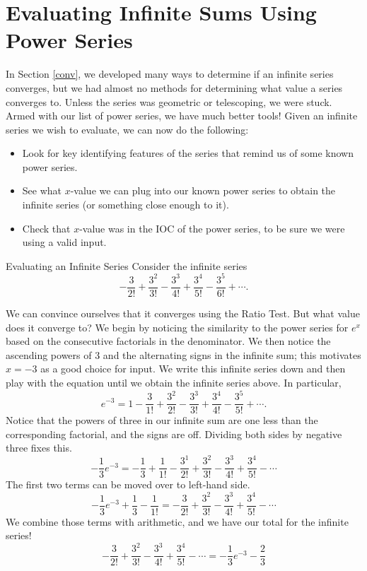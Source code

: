 
\section{Evaluating Infinite Sums Using Power Series}

In Section \ref{conv}, we developed many ways to determine if an infinite series converges, but we had almost no methods for determining what value a series converges to.  Unless the series was geometric or telescoping, we were stuck.  Armed with our list of power series, we have much better tools!  Given an infinite series we wish to evaluate, we can now do the following:

\begin{itemize}
\item Look for key identifying features of the series that remind us of some known power series.
\item See what $x$-value we can plug into our known power series to obtain the infinite series (or something close enough to it).
\item Check that $x$-value was in the IOC of the power series, to be sure we were using a valid input.
\end{itemize}

\begin{example}{Evaluating an Infinite Series}
Consider the infinite series $$ -\frac{3}{2!}+\frac{3^2}{3!}-\frac{3^3}{4!}+\frac{3^4}{5!}-\frac{3^5}{6!}+\cdots. $$

We can convince ourselves that it converges using the Ratio Test.  But what value does it converge to?  We begin by noticing the similarity to the power series for $e^x$ based on the consecutive factorials in the denominator.  We then notice the ascending powers of 3 and the alternating signs in the infinite sum; this motivates $x=-3$ as a good choice for input.  We write this infinite series down and then play with the equation until we obtain the infinite series above.  In particular,
$$e^{-3}=1-\frac{3}{1!}+\frac{3^2}{2!}-\frac{3^3}{3!}+\frac{3^4}{4!}-\frac{3^5}{5!}+\cdots. $$ 
Notice that the powers of three in our infinite sum are one less than the corresponding factorial, and the signs are off.  Dividing both sides by negative three fixes this.
$$-\frac{1}{3}e^{-3}=-\frac{1}{3}+\frac{1}{1!}-\frac{3^1}{2!}+\frac{3^2}{3!}-\frac{3^3}{4!}+\frac{3^4}{5!}-\cdots $$
The first two terms can be moved over to left-hand side. $$-\frac{1}{3}e^{-3}+\frac{1}{3}-\frac{1}{1!}=-\frac{3}{2!}+\frac{3^2}{3!}-\frac{3^3}{4!}+\frac{3^4}{5!}-\cdots $$
We combine those terms with arithmetic, and we have our total for the infinite series!
 $$-\frac{3}{2!}+\frac{3^2}{3!}-\frac{3^3}{4!}+\frac{3^4}{5!}-\cdots=-\frac{1}{3}e^{-3}-\frac{2}{3} $$
\end{example}

